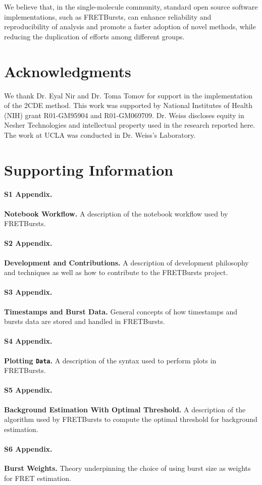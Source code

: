 \documentclass[10pt,letterpaper]{article}
\begin{document}
We believe that, in the single-molecule community,
standard open source software implementations, such as FRETBursts, can enhance
reliability and reproducibility of analysis and promote a faster adoption of novel methods,
while reducing the duplication of efforts among different groups.

\section*{Acknowledgments}
We thank Dr. Eyal Nir and Dr. Toma Tomov for support in the implementation of the 2CDE method.
This work was supported by National Institutes of Health (NIH)
grant R01-GM95904 and R01-GM069709. Dr. Weiss discloses equity in
Nesher Technologies and intellectual property used in the research
reported here. The work at UCLA was conducted in Dr. Weiss's Laboratory.

\section*{Supporting Information}


\paragraph*{S1 Appendix.}
\label{sec:notebook}
{\bf Notebook Workflow.} A description of the notebook workflow used by FRETBursts.

\paragraph*{S2 Appendix.}
\label{sec:dev}
{\bf Development and Contributions.} A description of development philosophy and techniques
as well as how to contribute to the FRETBursts project.

\paragraph*{S3 Appendix.}
\label{sec:burststimes}
{\bf Timestamps and Burst Data.} General concepts of how timestamps and
bursts data are stored and handled in FRETBursts.

\paragraph*{S4 Appendix.}
\label{sec:plotting}
{\bf Plotting \texttt{Data}.} A description of the syntax used to perform
plots in FRETBursts.

\paragraph*{S5 Appendix.}
\label{sec:bg_opt_th}
{\bf Background Estimation With Optimal Threshold.} A description of
the algorithm used by FRETBursts to compute the
optimal threshold for background estimation.

\paragraph*{S6 Appendix.}
\label{sec:burstweights_theory}
{\bf Burst Weights.} Theory underpinning the choice of using burst size
as weights for FRET estimation.

\nolinenumbers

\end{document}
